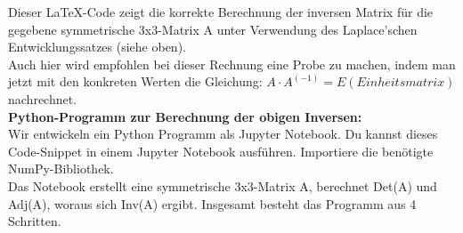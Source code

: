 \documentclass[12pt]{article}
\begin{document}
Dieser LaTeX-Code zeigt die korrekte Berechnung der inversen Matrix für die gegebene symmetrische 3x3-Matrix A unter Verwendung des Laplace'schen Entwicklungssatzes (siehe oben).\\[0.4cm]
Auch hier wird empfohlen bei dieser Rechnung eine Probe zu machen, indem man jetzt mit den konkreten Werten die Gleichung: $A \cdot A^{(-1)} = E (Einheitsmatrix)$ nachrechnet.\\[0.3cm]
%
\textbf{Python-Programm zur Berechnung der obigen Inversen:}\\[0.2cm] 
%
Wir entwickeln ein Python Programm als Jupyter Notebook. Du kannst dieses Code-Snippet in einem Jupyter Notebook ausführen. Importiere die benötigte NumPy-Bibliothek.\\ 
Das Notebook erstellt eine symmetrische 3x3-Matrix A, berechnet Det(A) und Adj(A), woraus sich Inv(A) ergibt. Insgesamt besteht das Programm aus 4 Schritten. 
\end{document}

